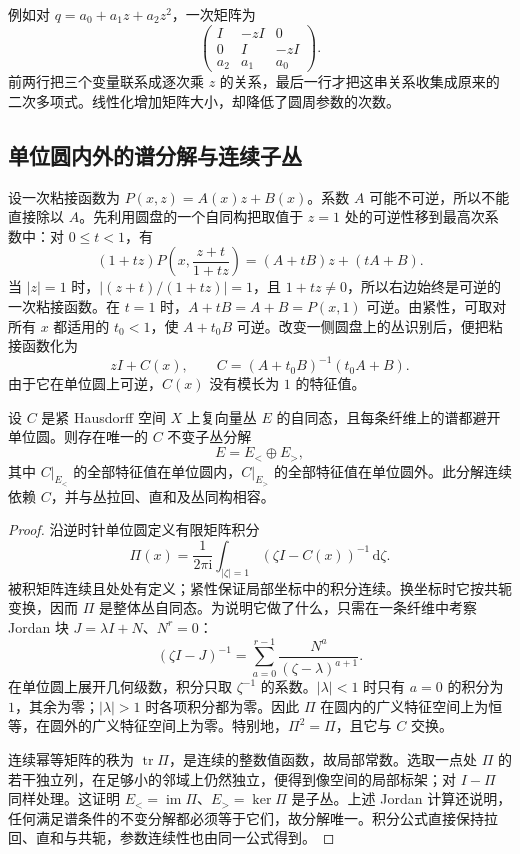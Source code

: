 例如对 \(q=a_0+a_1z+a_2z^2\)，一次矩阵为
\[
	\begin{pmatrix}I&-zI&0\\0&I&-zI\\a_2&a_1&a_0\end{pmatrix}.
\]
前两行把三个变量联系成逐次乘 \(z\) 的关系，最后一行才把这串关系收集成原来的二次多项式。线性化增加矩阵大小，却降低了圆周参数的次数。

\subsection{单位圆内外的谱分解与连续子丛}
\label{g2:subsec:2403:05}
设一次粘接函数为 \(P(x,z)=A(x)z+B(x)\)。系数 \(A\) 可能不可逆，所以不能直接除以 \(A\)。先利用圆盘的一个自同构把取值于 \(z=1\) 处的可逆性移到最高次系数中：对 \(0\le t<1\)，有
\begin{equation}\label{g2:eq:k-pencil-mobius}
	(1+tz)P\left(x,\frac{z+t}{1+tz}\right)
	=(A+tB)z+(tA+B).
\end{equation}
当 \(|z|=1\) 时，\(|(z+t)/(1+tz)|=1\)，且 \(1+tz\ne0\)，所以右边始终是可逆的一次粘接函数。在 \(t=1\) 时，\(A+tB=A+B=P(x,1)\) 可逆。由紧性，可取对所有 \(x\) 都适用的 \(t_0<1\)，使 \(A+t_0B\) 可逆。改变一侧圆盘上的丛识别后，便把粘接函数化为
\[
	zI+C(x),\qquad C=(A+t_0B)^{-1}(t_0A+B).
\]
由于它在单位圆上可逆，\(C(x)\) 没有模长为 \(1\) 的特征值。

\begin{lemma}\label{g2:lem:k-continuous-spectral-splitting}
	设 \(C\) 是紧 Hausdorff 空间 \(X\) 上复向量丛 \(E\) 的自同态，且每条纤维上的谱都避开单位圆。则存在唯一的 \(C\) 不变子丛分解
	\[
		E=E_<\oplus E_>,
	\]
	其中 \(C|_{E_<}\) 的全部特征值在单位圆内，\(C|_{E_>}\) 的全部特征值在单位圆外。此分解连续依赖 \(C\)，并与丛拉回、直和及丛同构相容。
\end{lemma}
\begin{proof}
	沿逆时针单位圆定义有限矩阵积分
	\[
		\Pi(x)=\frac1{2\pi\mathrm i}\int_{|\zeta|=1}(\zeta I-C(x))^{-1}\,\mathrm d\zeta.
	\]
	被积矩阵连续且处处有定义；紧性保证局部坐标中的积分连续。换坐标时它按共轭变换，因而 \(\Pi\) 是整体丛自同态。为说明它做了什么，只需在一条纤维中考察 Jordan 块 \(J=\lambda I+N\)、\(N^r=0\)：
	\[
		(\zeta I-J)^{-1}=\sum_{a=0}^{r-1}\frac{N^a}{(\zeta-\lambda)^{a+1}}.
	\]
	在单位圆上展开几何级数，积分只取 \(\zeta^{-1}\) 的系数。\(|\lambda|<1\) 时只有 \(a=0\) 的积分为 \(1\)，其余为零；\(|\lambda|>1\) 时各项积分都为零。因此 \(\Pi\) 在圆内的广义特征空间上为恒等，在圆外的广义特征空间上为零。特别地，\(\Pi^2=\Pi\)，且它与 \(C\) 交换。

	连续幂等矩阵的秩为 \(\operatorname{tr}\Pi\)，是连续的整数值函数，故局部常数。选取一点处 \(\Pi\) 的若干独立列，在足够小的邻域上仍然独立，便得到像空间的局部标架；对 \(I-\Pi\) 同样处理。这证明 \(E_<=\operatorname{im}\Pi\)、\(E_>=\ker\Pi\) 是子丛。上述 Jordan 计算还说明，任何满足谱条件的不变分解都必须等于它们，故分解唯一。积分公式直接保持拉回、直和与共轭，参数连续性也由同一公式得到。
\end{proof}

